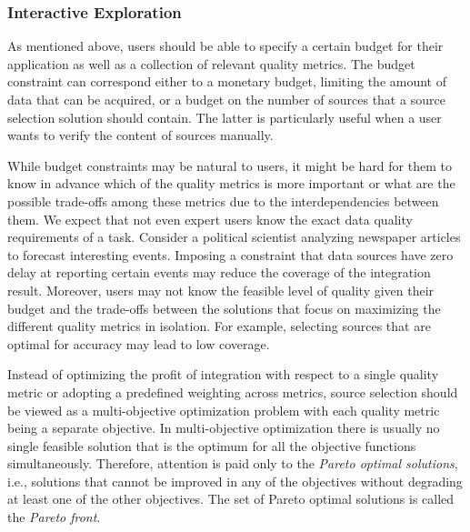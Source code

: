 \documentclass{sig-alternate}
\begin{document}

\subsubsection{Interactive Exploration}
\label{sec:eval}
As mentioned above, users should be able to specify a certain budget for their application as well as a collection of relevant quality metrics. The budget constraint can correspond either to a monetary budget, limiting the amount of data that can be acquired, or a budget on the number of sources that a source selection solution should contain. The latter is particularly useful when a user wants to verify the content of sources manually. 

While budget constraints may be natural to users, it might be hard for them to know in advance which of the quality metrics is more important or what are the possible trade-offs among these metrics due to the interdependencies between them. We expect that not even expert users know the exact data quality requirements of a task. Consider a political scientist analyzing newspaper articles to forecast interesting events. Imposing a constraint that data sources have zero delay at reporting certain events may reduce the coverage of the integration result. Moreover, users may not know the feasible level of quality given their budget and the trade-offs between the solutions that focus on maximizing the different quality metrics in isolation. For example, selecting sources that are optimal for accuracy may lead to low coverage.  

Instead of optimizing the profit of integration with respect to a single quality metric or adopting a predefined weighting across metrics, source selection should be viewed as a multi-objective optimization problem with each quality metric being a separate objective. In multi-objective optimization there is usually no single feasible solution that is the optimum for all the objective functions simultaneously. Therefore, attention is paid only to the {\em Pareto optimal solutions}, i.e., solutions that cannot be improved in any of the objectives without degrading at least one of the other objectives. The set of Pareto optimal solutions is called the {\em Pareto front}. 
\end{document}
